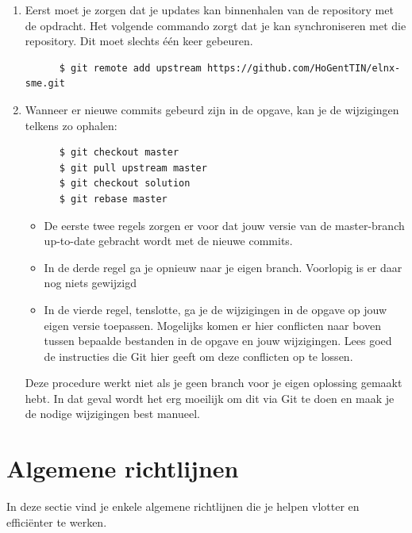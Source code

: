 \begin{enumerate}
  \item Eerst moet je zorgen dat je updates kan binnenhalen van de repository met de opdracht. Het volgende commando zorgt dat je kan synchroniseren met die repository. Dit moet slechts één keer gebeuren.

    \begin{verbatim}
      $ git remote add upstream https://github.com/HoGentTIN/elnx-sme.git
    \end{verbatim}

  \item Wanneer er nieuwe commits gebeurd zijn in de opgave, kan je de wijzigingen telkens zo ophalen:

    \begin{verbatim}
      $ git checkout master
      $ git pull upstream master
      $ git checkout solution
      $ git rebase master
    \end{verbatim}

    \begin{itemize}
      \item De eerste twee regels zorgen er voor dat jouw versie van de master-branch up-to-date gebracht wordt met de nieuwe commits.
      \item In de derde regel ga je opnieuw naar je eigen branch. Voorlopig is er daar nog niets gewijzigd
      \item In de vierde regel, tenslotte, ga je de wijzigingen in de opgave op jouw eigen versie toepassen. Mogelijks komen er hier conflicten naar boven tussen bepaalde bestanden in de opgave en jouw wijzigingen. Lees goed de instructies die Git hier geeft om deze conflicten op te lossen.
    \end{itemize}

Deze procedure werkt niet als je geen branch voor je eigen oplossing gemaakt hebt. In dat geval wordt het erg moeilijk om dit via Git te doen en maak je de nodige wijzigingen best manueel.

\end{enumerate}

\section{Algemene richtlijnen}
\label{sec:algemene_richtlijnen}

In deze sectie vind je enkele algemene richtlijnen die je helpen vlotter en efficiënter te werken.

